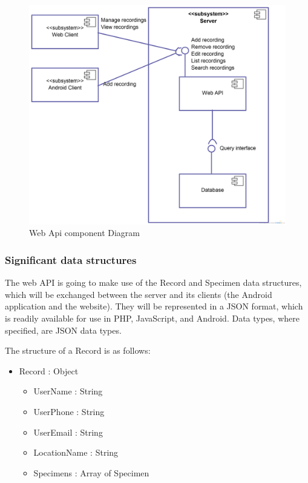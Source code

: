         \begin{landscape}
            \begin{figure}
                \centering
                \includegraphics[scale=0.2]{server/ComponentDiagram.png}
                \caption{Web Api component Diagram}
                \label{fig:webAPIComponentDiagram}
            \end{figure}
        \end{landscape}

    \subsubsection{Significant data structures}

        The web API is going to make use of the Record and Specimen data structures, which will be exchanged between the server and its clients (the Android application and the website). They will be represented in a JSON format, which is readily available for use in PHP, JavaScript, and Android. Data types, where specified, are JSON data types. 

        The structure of a Record is as follows:
        \begin{itemize}
            \item Record : Object
            \begin{itemize}
                \item UserName : String
                \item UserPhone : String
								\item UserEmail : String
                \item LocationName : String 
                \item Specimens : Array of Specimen
            \end{itemize}
        \end{itemize}

